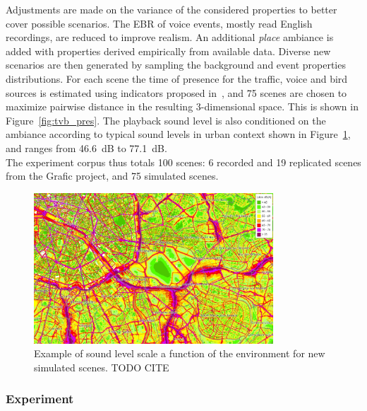 \documentclass[11pt,a4paper]{article}
\begin{document}
Adjustments are made on the variance of the considered properties to better cover possible scenarios. The EBR of voice events, mostly read English recordings, are reduced to improve realism. An additional \textit{place} ambiance is added with properties derived empirically from available data. Diverse new scenarios are then generated by sampling the background and event properties distributions. For each scene the time of presence for the traffic, voice and bird sources is estimated using indicators proposed in~\cite{gontier2018}, and 75 scenes are chosen to maximize pairwise distance in the resulting 3-dimensional space. This is shown in Figure~\ref{fig:tvb_pres}. The playback sound level is also conditioned on the ambiance according to typical sound levels in urban context shown in Figure~\ref{fig:amb_levels}, and ranges from 46.6~dB to 77.1~dB.\\

The experiment corpus thus totals 100 scenes: 6 recorded and 19 replicated scenes from the Grafic project, and 75 simulated scenes.

\begin{figure}[!h]
    \centering
    \includegraphics[width=0.8\textwidth]{figures/lvls.jpg}
    \caption{Example of sound level scale a function of the environment for new simulated scenes. TODO CITE}\label{fig:amb_levels}
\end{figure}


\subsubsection{Experiment}
\label{sec:pval_exp}
\end{document}
